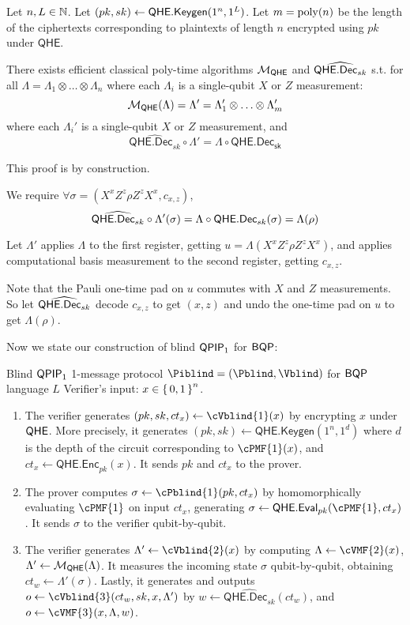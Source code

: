 \begin{thm}
	\label{decodeMeasureOrder}
	Let $n, L\in\mathbb{N}$.
	Let $(pk, sk)\leftarrow\mathsf{QHE.Keygen}(1^n, 1^L)$.
	Let $m=\operatorname*{\operatorname{poly}}(n)$ be the length of the ciphertexts corresponding to plaintexts of length $n$ encrypted using $pk$ under $\mathsf{QHE}$.
	
	There exists efficient classical poly-time algorithms ${\cal M}_{\mathsf{QHE}}$ and $\widehat{\mathsf{QHE.Dec}_{sk}}$ s.t.
	for all $\Lambda=\Lambda_1\otimes\ldots\otimes\Lambda_n$ where each $\Lambda_i$ is a single-qubit $X$ or $Z$ measurement:
	$${\cal M}_{\mathsf{QHE}}(\Lambda)=\Lambda'=\Lambda'_1\otimes\ldots\otimes\Lambda'_m$$
	where each $\Lambda_i'$ is a single-qubit $X$ or $Z$ measurement, and
	$$\widehat{\mathsf{QHE.Dec}_{sk}}\circ\Lambda'=\Lambda\circ\mathsf{QHE.Dec_{sk}}$$
\end{thm}
\begin{prf}
	This proof is by construction.

	We require $\forall\sigma=(X^xZ^z\rho Z^zX^x, c_{x,z})$,
	$$\widehat{\mathsf{QHE.Dec}_{sk}}\circ\Lambda'(\sigma)=\Lambda\circ\mathsf{QHE.Dec}_{sk}(\sigma)=\Lambda(\rho)$$
	
	Let $\Lambda'$ applies $\Lambda$ to the first register, getting $u=\Lambda(X^xZ^z\rho Z^zX^x)$, and applies computational basis measurement to the second register, getting $c_{x, z}$.

	Note that the Pauli one-time pad on $u$ commutes with $X$ and $Z$ measurements.
	So let $\widehat{\mathsf{QHE.Dec}_{sk}}$ decode $c_{x, z}$ to get $(x, z)$ and undo the one-time pad on $u$ to get $\Lambda(\rho)$.
\end{prf}

Now we state our construction of blind $\operatorname{\mathsf{QPIP}}_1$ for $\operatorname{\mathsf{BQP}}$:

\begin{protocol}{Blind $\operatorname{\mathsf{QPIP}}_1$ 1-message protocol $\Piblind = (\Pblind, \Vblind)$ for $\operatorname{\mathsf{BQP}}$ language $L$}
	\label{proto:BlindBQP}
	Verifier's input: $x\in\set{0,1}^n$.
	
	\begin{enumerate}
		\item The verifier generates $(pk, sk, ct_x)\leftarrow\cVblind{1}(x)$ by encrypting $x$ under $\mathsf{QHE}$.
			More precisely, it generates
			$(pk, sk)\leftarrow\mathsf{QHE.Keygen}(1^n, 1^d)$ where $d$ is the depth of the circuit corresponding to $\cPMF{1}(x)$, and
			$ct_x\leftarrow\mathsf{QHE.Enc}_{pk}(x)$.
			It sends $pk$ and $ct_x$ to the prover.
		\item The prover computes $\sigma\leftarrow\cPblind{1}(pk, ct_x)$ by homomorphically evaluating $\cPMF{1}$ on input $ct_x$, generating $\sigma\leftarrow\QEval_{pk}(\cPMF{1}, ct_x)$.
			It sends $\sigma$ to the verifier qubit-by-qubit.
		\item The verifier generates $\Lambda'\leftarrow\cVblind{2}(x)$ by computing
			$\Lambda\leftarrow\cVMF{2}(x)$,
			$\Lambda'\leftarrow{\cal M}_{\mathsf{QHE}}(\Lambda)$.
			It measures the incoming state $\sigma$ qubit-by-qubit, obtaining $ct_w\leftarrow\Lambda'(\sigma)$.
			Lastly, it generates and outputs $o\leftarrow\cVblind{3}(ct_w, sk, x, \Lambda')$ by
			$w\leftarrow\widehat{\mathsf{QHE.Dec}_{sk}}(ct_w)$,
			and $o\leftarrow\cVMF{3}(x, \Lambda, w)$.
	\end{enumerate}
\end{protocol}

